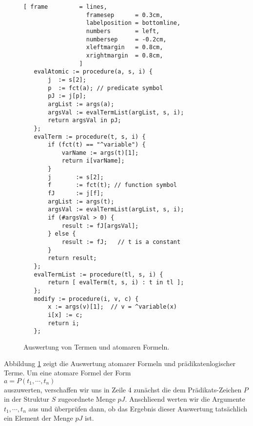 \begin{figure}[!ht]
  \centering
\begin{Verbatim}[ frame         = lines, 
                  framesep      = 0.3cm, 
                  labelposition = bottomline,
                  numbers       = left,
                  numbersep     = -0.2cm,
                  xleftmargin   = 0.8cm,
                  xrightmargin  = 0.8cm,
                ]
   evalAtomic := procedure(a, s, i) {
       j  := s[2];
       p  := fct(a); // predicate symbol
       pJ := j[p];
       argList := args(a);
       argsVal := evalTermList(argList, s, i);
       return argsVal in pJ;
   };  
   evalTerm := procedure(t, s, i) {
       if (fct(t) == "^variable") {
           varName := args(t)[1];
           return i[varName];
       }
       j       := s[2];
       f       := fct(t); // function symbol
       fJ      := j[f];
       argList := args(t);
       argsVal := evalTermList(argList, s, i);
       if (#argsVal > 0) {        
           result := fJ[argsVal]; 
       } else {
           result := fJ;   // t is a constant
       }
       return result;
   };
   evalTermList := procedure(tl, s, i) {
       return [ evalTerm(t, s, i) : t in tl ];
   };
   modify := procedure(i, v, c) {
       x := args(v)[1];  // v = ^variable(x)
       i[x] := c;
       return i;
   };
\end{Verbatim}
\vspace*{-0.3cm}
\caption{Auswertung von Termen und atomaren Formeln.}
\label{fig:fol-evaluate-term.stlx}
\end{figure}

Abbildung \ref{fig:fol-evaluate-term.stlx} zeigt die Auswertung atomarer Formeln und
pr\"{a}dikatenlogischer Terme.  Um eine atomare Formel der Form
\\[0.2cm]
\hspace*{1.3cm}
$a = P(t_1, \cdots, t_n)$ 
\\[0.2cm]
auszuwerten, verschaffen wir uns in Zeile 4 zun\"{a}chst die dem Pr\"{a}dikats-Zeichen $P$ in der
Struktur $S$ zugeordnete Menge $pJ$.  Anschlie\3end werten wir die Argumente $t_1, \cdots, t_n$ 
aus und \"{u}berpr\"{u}fen dann, ob das Ergebnis dieser Auswertung tats\"{a}chlich ein Element der Menge $pJ$ ist.

